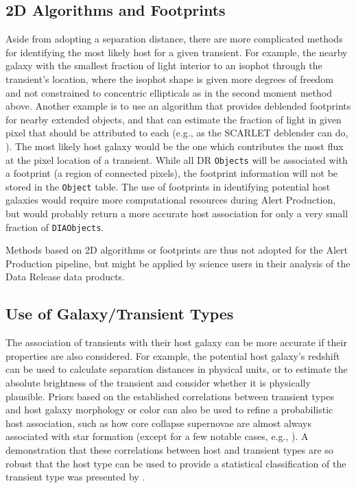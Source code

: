 \documentclass[DM,authoryear,toc]{lsstdoc}
\begin{document}
\subsection{2D Algorithms and Footprints}\label{ssec:options_footprint}

Aside from adopting a separation distance, there are more complicated methods for identifying the most likely host for a given transient.
For example, the nearby galaxy with the smallest fraction of light interior to an isophot through the transient's location, where the isophot shape is given more degrees of freedom and not constrained to concentric ellipticals as in the second moment method above.
Another example is to use an algorithm that provides deblended footprints for nearby extended objects, and that can estimate the fraction of light in given pixel that should be attributed to each (e.g., as the SCARLET deblender can do, \cite{2018A&C....24..129M}).
The most likely host galaxy would be the one which contributes the most flux at the pixel location of a transient.
While all DR {\tt Objects} will be associated with a footprint (a region of connected pixels), the footprint information will not be stored in the {\tt Object} table.
The use of footprints in identifying potential host galaxies would require more computational resources during Alert Production, but would probably return a more accurate host association for only a very small fraction of {\tt DIAObjects}. 

Methods based on 2D algorithms or footprints are thus not adopted for the Alert Production pipeline, but might be applied by science users in their analysis of the Data Release data products. 


\subsection{Use of Galaxy/Transient Types}\label{ssec:options_galtypes}

The association of transients with their host galaxy can be more accurate if their properties are also considered.
For example, the potential host galaxy's redshift can be used to calculate separation distances in physical units, or to estimate the absolute brightness of the transient and consider whether it is physically plausible.
Priors based on the established correlations between transient types and host galaxy morphology or color can also be used to refine a probabilistic host association, such as how core collapse supernovae are almost always associated with star formation (except for a few notable cases, e.g., \citealt{2012ApJ...753...68G,2019ApJ...887..127I}).
A demonstration that these correlations between host and transient types are so robust that the host type can be used to provide a statistical classification of the transient type was presented by \citet{2013ApJ...778..167F}.
\end{document}
